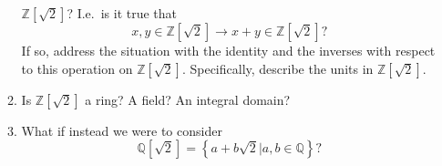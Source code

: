 \documentclass[10pt]{amsart}
\begin{document}
\begin{enumerate}
\begin{enumerate}[listparindent=0.7cm]
        $\mathbb{Z}\left[\sqrt{2}\right]$? I.e.\ is it true that
        \[x,y\in\mathbb{Z}\left[\sqrt{2}\right]\rightarrow
        x+y\in\mathbb{Z}\left[\sqrt{2}\right]?\] If so, address the situation
        with the identity and the inverses with respect to this operation on
        $\mathbb{Z}\left[\sqrt{2}\right]$. Specifically, describe the units in
        $\mathbb{Z}\left[\sqrt{2}\right]$.
      \item Is $\mathbb{Z}\left[\sqrt{2}\right]$ a ring? A field? An integral
        domain?
      \item What if instead we were to consider
        \[\mathbb{Q}\left[\sqrt{2}\right]=\left\{a+b\sqrt{2}|a,b\in\mathbb{Q}\right\}?\]
    \end{enumerate}
\end{enumerate}
\end{document}
